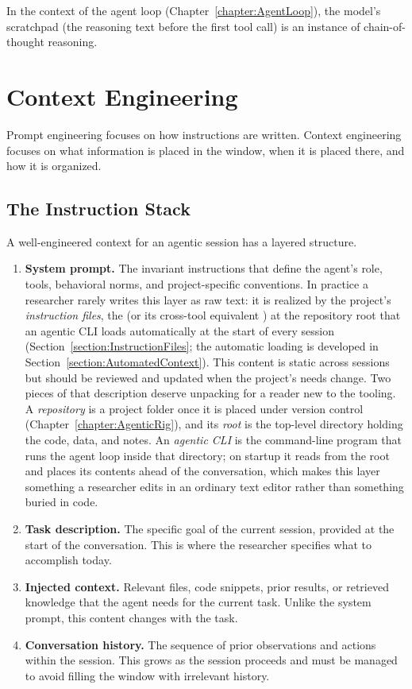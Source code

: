 In the context of the agent loop (Chapter~\ref{chapter:AgentLoop}), the model's scratchpad (the reasoning text before the first tool call) is an instance of chain-of-thought reasoning.

\section{Context Engineering}
\label{section:ContextEngineeringDetail}

Prompt engineering focuses on how instructions are written.
Context engineering focuses on what information is placed in the window, when it is placed there, and how it is organized.

\subsection{The Instruction Stack}

A well-engineered context for an agentic session has a layered structure.

\begin{enumerate}
\item \textbf{System prompt.} The invariant instructions that define the agent's role, tools, behavioral norms, and project-specific conventions.
In practice a researcher rarely writes this layer as raw text: it is realized by the project's \emph{instruction files}, the  (or its cross-tool equivalent ) at the repository root that an agentic CLI loads automatically at the start of every session (Section~\ref{section:InstructionFiles}; the automatic loading is developed in Section~\ref{section:AutomatedContext}).
This content is static across sessions but should be reviewed and updated when the project's needs change.
Two pieces of that description deserve unpacking for a reader new to the tooling.
A \emph{repository} is a project folder once it is placed under version control (Chapter~\ref{chapter:AgenticRig}), and its \emph{root} is the top-level directory holding the code, data, and notes.
An \emph{agentic CLI} is the command-line program that runs the agent loop inside that directory; on startup it reads  from the root and places its contents ahead of the conversation, which makes this layer something a researcher edits in an ordinary text editor rather than something buried in code.

\item \textbf{Task description.} The specific goal of the current session, provided at the start of the conversation.
This is where the researcher specifies what to accomplish today.

\item \textbf{Injected context.} Relevant files, code snippets, prior results, or retrieved knowledge that the agent needs for the current task.
Unlike the system prompt, this content changes with the task.

\item \textbf{Conversation history.} The sequence of prior observations and actions within the session.
This grows as the session proceeds and must be managed to avoid filling the window with irrelevant history.
\end{enumerate}

